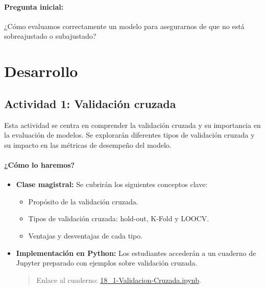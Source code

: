 \documentclass[a4,11pt]{aleph-notas}
\begin{document}
\paragraph{Pregunta inicial:} 
¿Cómo evaluamos correctamente un modelo para asegurarnos de que no está sobreajustado o subajustado?



\section*{Desarrollo}

\subsection*{Actividad 1: Validación cruzada}

Esta actividad se centra en comprender la validación cruzada y su importancia en la evaluación de modelos. Se explorarán diferentes tipos de validación cruzada y su impacto en las métricas de desempeño del modelo.

\paragraph{¿Cómo lo haremos?}  
\begin{itemize}[leftmargin=*]
    \item \textbf{Clase magistral:} Se cubrirán los siguientes conceptos clave:
    \begin{itemize}
        \item Propósito de la validación cruzada.
        \item Tipos de validación cruzada: hold-out, K-Fold y LOOCV.
        \item Ventajas y desventajas de cada tipo.
    \end{itemize}
    \item \textbf{Implementación en Python:} Los estudiantes accederán a un cuaderno de Jupyter preparado con ejemplos sobre validación cruzada.
    \begin{quote}
        Enlace al cuaderno: \href{https://colab.research.google.com/github/andres-merino/AprendizajeAutomaticoInicial-05-N0105/blob/main/2-Notebooks/18_1-Validacion-Cruzada.ipynb}{18\_1-Validacion-Cruzada.ipynb}.
    \end{quote}
\end{itemize}
\end{document}
